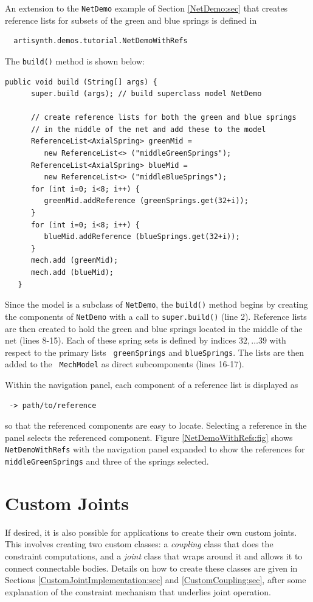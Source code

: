 An extension to the {\tt NetDemo} example of Section \ref{NetDemo:sec}
that creates reference lists for subsets of the green and blue springs
is defined in
%
\begin{verbatim}
  artisynth.demos.tutorial.NetDemoWithRefs
\end{verbatim}
%
The {\tt build()} method is shown below:
%
\lstset{numbers=left}
\begin{lstlisting}[]
   public void build (String[] args) {
      super.build (args); // build superclass model NetDemo

      // create reference lists for both the green and blue springs
      // in the middle of the net and add these to the model
      ReferenceList<AxialSpring> greenMid = 
         new ReferenceList<> ("middleGreenSprings");
      ReferenceList<AxialSpring> blueMid = 
         new ReferenceList<> ("middleBlueSprings");
      for (int i=0; i<8; i++) {
         greenMid.addReference (greenSprings.get(32+i));
      }
      for (int i=0; i<8; i++) {
         blueMid.addReference (blueSprings.get(32+i));
      }
      mech.add (greenMid);
      mech.add (blueMid);
   }
\end{lstlisting}
\lstset{numbers=none}
%
Since the model is a subclass of {\tt NetDemo}, the {\tt build()} method begins
by creating the components of {\tt NetDemo} with a call to {\tt super.build()}
(line 2). Reference lists are then created to hold the green and blue springs
located in the middle of the net (lines 8-15). Each of these spring sets is
defined by indices $32, \ldots 39$ with respect to the primary lists {\tt
greenSprings} and {\tt blueSprings}. The lists are then added to the {\tt
MechModel} as direct subcomponents (lines 16-17).

Within the navigation panel, each component of a reference list is displayed as
%
\begin{verbatim}
 -> path/to/reference
\end{verbatim}
%
so that the referenced components are easy to locate. Selecting a reference in
the panel selects the referenced component. Figure
\ref{NetDemoWithRefs:fig} shows {\tt NetDemoWithRefs} with
the navigation panel expanded to show the references for {\tt
middleGreenSprings} and three of the springs selected.

\section{Custom Joints}

If desired, it is also possible for applications to create their own
custom joints. This involves creating two custom classes: a {\it
coupling} class that does the constraint computations, and a {\it
joint} class that wraps around it and allows it to connect connectable
bodies. Details on how to create these classes are given in
Sections \ref{CustomJointImplementation:sec} and
\ref{CustomCoupling:sec}, after some explanation
of the constraint mechanism that underlies joint operation.

